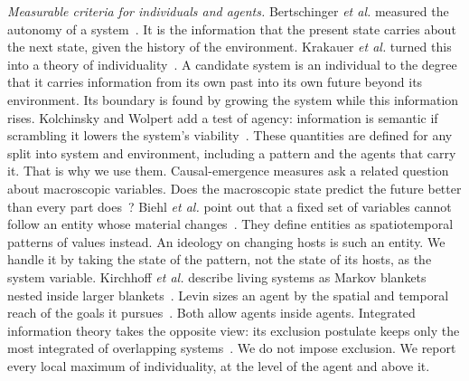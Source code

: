 \emph{Measurable criteria for individuals and agents.} Bertschinger \emph{et al.} measured the autonomy of a system~\cite{bertschinger2008}. It is the information that the present state carries about the next state, given the history of the environment. Krakauer \emph{et al.} turned this into a theory of individuality~\cite{krakauer2020}. A candidate system is an individual to the degree that it carries information from its own past into its own future beyond its environment. Its boundary is found by growing the system while this information rises. Kolchinsky and Wolpert add a test of agency: information is semantic if scrambling it lowers the system's viability~\cite{kolchinsky2018}. These quantities are defined for any split into system and environment, including a pattern and the agents that carry it. That is why we use them. Causal-emergence measures ask a related question about macroscopic variables. Does the macroscopic state predict the future better than every part does~\cite{rosas2020,mediano2022}? Biehl \emph{et al.} point out that a fixed set of variables cannot follow an entity whose material changes~\cite{biehl2016}. They define entities as spatiotemporal patterns of values instead. An ideology on changing hosts is such an entity. We handle it by taking the state of the pattern, not the state of its hosts, as the system variable. Kirchhoff \emph{et al.} describe living systems as Markov blankets nested inside larger blankets~\cite{kirchhoff2018}. Levin sizes an agent by the spatial and temporal reach of the goals it pursues~\cite{levin2022}. Both allow agents inside agents. Integrated information theory takes the opposite view: its exclusion postulate keeps only the most integrated of overlapping systems~\cite{oizumi2014}. We do not impose exclusion. We report every local maximum of individuality, at the level of the agent and above it.

